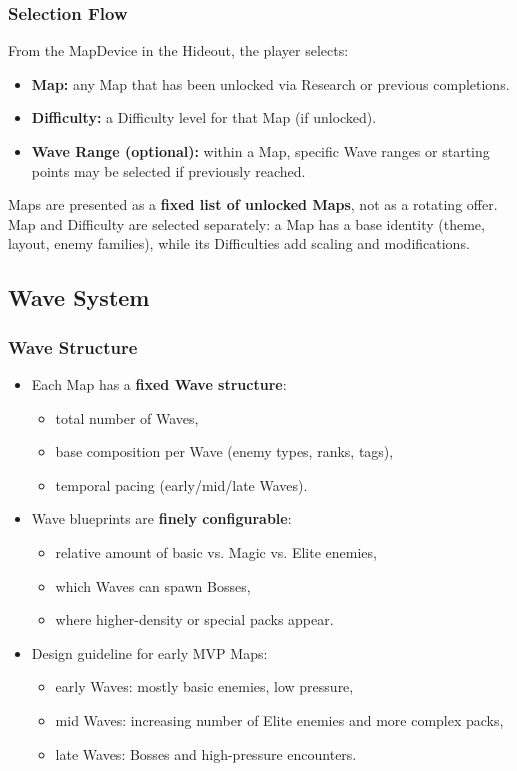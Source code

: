 \subsubsection*{Selection Flow}

From the MapDevice in the Hideout, the player selects:

\begin{itemize}
	\item \textbf{Map:} any Map that has been unlocked via Research or previous completions.
	\item \textbf{Difficulty:} a Difficulty level for that Map (if unlocked).
	\item \textbf{Wave Range (optional):} within a Map, specific Wave ranges or starting points may be selected if previously reached.
\end{itemize}

Maps are presented as a \textbf{fixed list of unlocked Maps}, not as a rotating offer. 
Map and Difficulty are selected separately: a Map has a base identity (theme, layout, enemy families), while its Difficulties add scaling and modifications.


\subsection{Wave System}

\subsubsection*{Wave Structure}

\begin{itemize}
	\item Each Map has a \textbf{fixed Wave structure}:
	\begin{itemize}
		\item total number of Waves,
		\item base composition per Wave (enemy types, ranks, tags),
		\item temporal pacing (early/mid/late Waves).
	\end{itemize}
	\item Wave blueprints are \textbf{finely configurable}:
	\begin{itemize}
		\item relative amount of basic vs. Magic vs. Elite enemies,
		\item which Waves can spawn Bosses,
		\item where higher-density or special packs appear.
	\end{itemize}
	\item Design guideline for early MVP Maps:
	\begin{itemize}
		\item early Waves: mostly basic enemies, low pressure,
		\item mid Waves: increasing number of Elite enemies and more complex packs,
		\item late Waves: Bosses and high-pressure encounters.
	\end{itemize}
\end{itemize}

